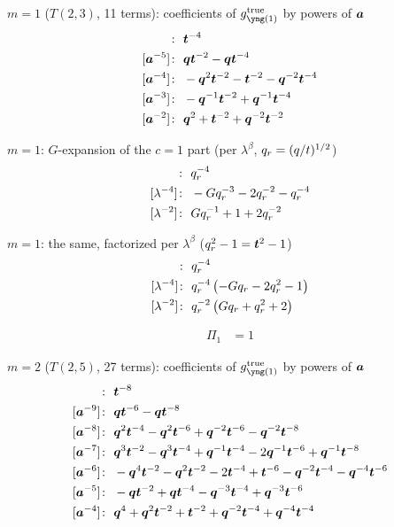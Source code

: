 $m = 1$ ($T(2,3)$, 11 terms): coefficients of $g^{\mathrm{true}}_{\yone}$ by powers of $\bm{a}$
\begin{align*}
[\ba^{-6}]\colon\ & \bt^{-4} \\
[\ba^{-5}]\colon\ & \bq \bt^{-2} -\bq \bt^{-4} \\
[\ba^{-4}]\colon\ & -\bq^{2} \bt^{-2} -\bt^{-2} -\bq^{-2} \bt^{-4} \\
[\ba^{-3}]\colon\ & -\bq^{-1} \bt^{-2} +\bq^{-1} \bt^{-4} \\
[\ba^{-2}]\colon\ & \bq^{2} +\bt^{-2} +\bq^{-2} \bt^{-2}
\end{align*}

$m = 1$: $G$-expansion of the $c = 1$ part (per $\lambda^\beta$, $q_r = (q/t)^{1/2}$)
\begin{align*}
[\lambda^{-6}]\colon\ & \qr^{-4} \\
[\lambda^{-4}]\colon\ & -G \qr^{-3} -2 \qr^{-2} -\qr^{-4} \\
[\lambda^{-2}]\colon\ & G \qr^{-1} +1 +2 \qr^{-2}
\end{align*}

$m = 1$: the same, factorized per $\lambda^\beta$ ($q_r^2 - 1 = \bm{t}^2 - 1$)
\begin{align*}
[\lambda^{-6}]\colon\ & \qr^{-4} \\
[\lambda^{-4}]\colon\ & \qr^{-4}\,\bigl(- G \qr - 2 \qr^{2} - 1\bigr) \\
[\lambda^{-2}]\colon\ & \qr^{-2}\,\bigl(G \qr + \qr^{2} + 2\bigr)
\end{align*}

\begin{align*}
\Pi_{1} &= 1
\end{align*}

$m = 2$ ($T(2,5)$, 27 terms): coefficients of $g^{\mathrm{true}}_{\yone}$ by powers of $\bm{a}$
\begin{align*}
[\ba^{-10}]\colon\ & \bt^{-8} \\
[\ba^{-9}]\colon\ & \bq \bt^{-6} -\bq \bt^{-8} \\
[\ba^{-8}]\colon\ & \bq^{2} \bt^{-4} -\bq^{2} \bt^{-6} +\bq^{-2} \bt^{-6} -\bq^{-2} \bt^{-8} \\
[\ba^{-7}]\colon\ & \bq^{3} \bt^{-2} -\bq^{3} \bt^{-4} +\bq^{-1} \bt^{-4} -2 \bq^{-1} \bt^{-6} +\bq^{-1} \bt^{-8} \\
[\ba^{-6}]\colon\ & -\bq^{4} \bt^{-2} -\bq^{2} \bt^{-2} -2 \bt^{-4} +\bt^{-6} -\bq^{-2} \bt^{-4} -\bq^{-4} \bt^{-6} \\
[\ba^{-5}]\colon\ & -\bq \bt^{-2} +\bq \bt^{-4} -\bq^{-3} \bt^{-4} +\bq^{-3} \bt^{-6} \\
[\ba^{-4}]\colon\ & \bq^{4} +\bq^{2} \bt^{-2} +\bt^{-2} +\bq^{-2} \bt^{-4} +\bq^{-4} \bt^{-4}
\end{align*}

